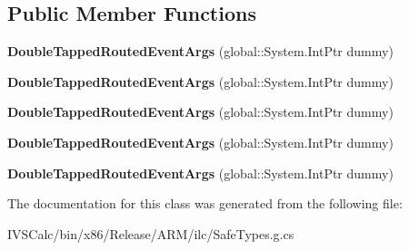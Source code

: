 \subsection*{Public Member Functions}
\begin{DoxyCompactItemize}
\item 
\mbox{\label{class_windows_1_1_u_i_1_1_xaml_1_1_input_1_1_double_tapped_routed_event_args_a9ce0e865299485d087508761993c9335}} 
{\bfseries Double\+Tapped\+Routed\+Event\+Args} (global\+::\+System.\+Int\+Ptr dummy)
\item 
\mbox{\label{class_windows_1_1_u_i_1_1_xaml_1_1_input_1_1_double_tapped_routed_event_args_a9ce0e865299485d087508761993c9335}} 
{\bfseries Double\+Tapped\+Routed\+Event\+Args} (global\+::\+System.\+Int\+Ptr dummy)
\item 
\mbox{\label{class_windows_1_1_u_i_1_1_xaml_1_1_input_1_1_double_tapped_routed_event_args_a9ce0e865299485d087508761993c9335}} 
{\bfseries Double\+Tapped\+Routed\+Event\+Args} (global\+::\+System.\+Int\+Ptr dummy)
\item 
\mbox{\label{class_windows_1_1_u_i_1_1_xaml_1_1_input_1_1_double_tapped_routed_event_args_a9ce0e865299485d087508761993c9335}} 
{\bfseries Double\+Tapped\+Routed\+Event\+Args} (global\+::\+System.\+Int\+Ptr dummy)
\item 
\mbox{\label{class_windows_1_1_u_i_1_1_xaml_1_1_input_1_1_double_tapped_routed_event_args_a9ce0e865299485d087508761993c9335}} 
{\bfseries Double\+Tapped\+Routed\+Event\+Args} (global\+::\+System.\+Int\+Ptr dummy)
\end{DoxyCompactItemize}


The documentation for this class was generated from the following file\+:\begin{DoxyCompactItemize}
\item 
I\+V\+S\+Calc/bin/x86/\+Release/\+A\+R\+M/ilc/Safe\+Types.\+g.\+cs\end{DoxyCompactItemize}
